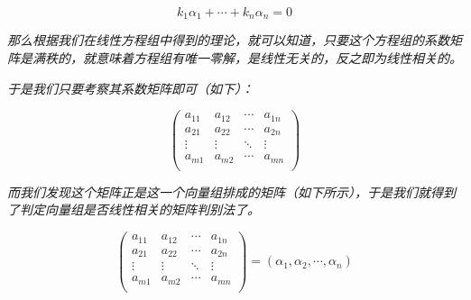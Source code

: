 \documentclass[a4paper]{ctexart}
\begin{document}
$$
k_{1}\alpha_{1}+\cdots+k_{n}\alpha_{n}=0
$$

\textit{那么根据我们在线性方程组中得到的理论，就可以知道，只要这个方程组的系数矩阵是满秩的，就意味着方程组有唯一零解，是线性无关的，反之即为线性相关的。}

\textit{于是我们只要考察其系数矩阵即可（如下）：}

$$
\begin{pmatrix}
a_{11}&a_{12}&\cdots&a_{1n}\\
a_{21}&a_{22}&\cdots&a_{2n}\\
\vdots&\vdots&\ddots&\vdots\\
a_{m1}&a_{m2}&\cdots&a_{mn}\\
\end{pmatrix}
$$

\textit{而我们发现这个矩阵正是这一个向量组排成的矩阵（如下所示），于是我们就得到了判定向量组是否线性相关的矩阵判别法了。}

$$
\left(
\begin{array}{c|c|c|c}
a_{11}&a_{12}&\cdots&a_{1n}\\
a_{21}&a_{22}&\cdots&a_{2n}\\
\vdots&\vdots&\ddots&\vdots\\
a_{m1}&a_{m2}&\cdots&a_{mn}\\
\end{array}
\right)
=
(\alpha_{1},\alpha_{2},\cdots,\alpha_{n})
$$
\end{document}
